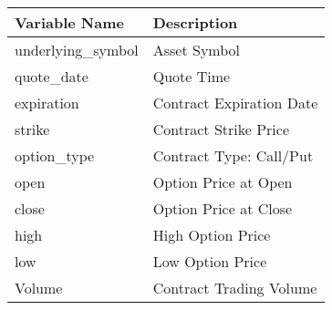 \begin{tabular}{ll}
\hline
 Variable Name     & Description              \\
\hline
 underlying\_symbol & Asset Symbol             \\
 quote\_date        & Quote Time               \\
 expiration        & Contract Expiration Date \\
 strike            & Contract Strike Price    \\
 option\_type       & Contract Type: Call/Put  \\
 open              & Option Price at Open     \\
 close             & Option Price at Close    \\
 high              & High Option Price        \\
 low               & Low Option Price         \\
 Volume            & Contract Trading Volume  \\
\hline
\end{tabular}